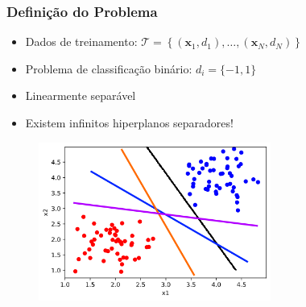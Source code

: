 \documentclass{beamer}
\begin{document}
\begin{frame}
	\frametitle{Definição do Problema}
	\begin{itemize}
		\item Dados de treinamento: $\mathcal{T} = \left\lbrace (\textbf{x}_1, d_1), \dots, (\textbf{x}_N, d_N)\right\rbrace $
		\item Problema de classificação binário: $d_i = \{ -1, 1 \} $
		\item Linearmente separável
		\item Existem infinitos hiperplanos separadores!
		
	\end{itemize}
	\begin{figure}[h!]
		\centering
		\includegraphics[width=3.0in]{fig01_01.png}
		\label{fig:plano-mse}
	\end{figure}

\end{frame}

\end{document}
